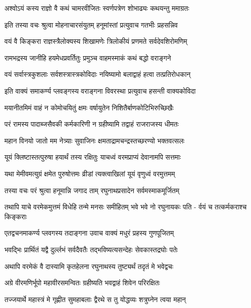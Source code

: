 \twolineshloka
{अश्वोऽयं कस्य राज्ञो वै कथं चामरवीजितः}
{स्वर्णपत्रेण शोभाढ्यः कथयन्तु ममाग्रतः}%


\twolineshloka
{इति तस्या वचः श्रुत्वा मोहनाचारसंयुतम्}
{हनूमांस्तां प्रत्युवाच गतभीः प्रहसन्निव}%

\twolineshloka
{वयं वै किङ्करा राज्ञस्त्रैलोक्यस्य शिखामणेः}
{त्रिलोकीयं प्रणमते सर्वदेवशिरोमणिम्}%

\twolineshloka
{रामभद्रस्य जानीहि हयमेधप्रवर्तितुः}
{प्रमुञ्च वाहमस्माकं कथं बद्धो वराङ्गने}%

\twolineshloka
{वयं सर्वास्त्रकुशलाः सर्वशस्त्रास्त्रकोविदाः}
{नयिष्यामो बलाद्वाहं हत्वा तत्प्रतिरोधकान्}%

\twolineshloka
{इति वाक्यं समाकर्ण्य प्लवङ्गस्य वराङ्गना}
{विवरस्था प्रत्युवाच हसन्ती वाक्यकोविदा}%

\twolineshloka
{मयानीतमिमं वाहं न कोमोचयितुं क्षमः}
{वर्षायुतेन निशितैर्बाणकोटिभिरुच्छिखैः}%

\twolineshloka
{परं रामस्य पादाब्जसैवकी कर्मकारिणी}
{न ग्रहीष्यामि तद्वाहं राजराजस्य धीमतः}%

\twolineshloka
{महान विनयो जातो मम नेत्र्याः सुवाजिनः}
{क्षमताद्रामचन्द्रस्तच्छरण्यो भक्तवत्सलः}%

\twolineshloka
{यूयं क्लिष्टास्तत्पुरुषा हयार्थं तस्य रक्षितुः}
{याचध्वं वरमप्राप्यं देवानामपि सत्तमाः}%

\twolineshloka
{यथा मेमीवमत्युग्रं क्षमेत पुरुषोत्तमः}
{व्रीडां त्यक्त्वाखिलां यूयं वृणुध्वं वरमुत्तमम्}%

\twolineshloka
{तस्या वचः परं श्रुत्वा हनूमान्नि जगाद ताम्}
{रघुनाथप्रसादेन सर्वमस्माकमूर्जितम्}%

\fourlineindentedshloka
{तथापि याचे वरमेकमुत्तमं}
{विधेहि तन्मे मनसः समीहितम्}
{भवे भवे नो रघुनायकः पति -}
{र्वयं च तत्कर्मकराश्च किङ्कराः}%

\twolineshloka
{एतद्वचनमाकर्ण्य प्लवगस्य तदाङ्गना}
{उवाच वाक्यं मधुरं प्रहस्य गुणपूजितम्}%

\twolineshloka
{भवद्भिः प्रार्थितं यद्वै दुर्ल्लभं सर्वदैवतैः}
{तद्भविष्यत्यसन्देहः सेवकास्तद्रघोः पतेः}%

\twolineshloka
{अथापि वरमेकं वै दास्यामि कृतहेलना}
{रघुनाथस्य तुष्ट्यर्थं तदृतं मे भवेद्वचः}%

\twolineshloka
{अग्रे वीरमणिर्भूपो महावीरसमन्वितः}
{ग्रहीष्यति भवद्वाहं शिवेन परिरक्षितः}%

\twolineshloka
{तज्जयार्थे महास्त्रं मे गृह्णीत सुमहाबलाः}
{द्वैरथे स तु योद्धव्यः शत्रुघ्नेन त्वया महान्}%

